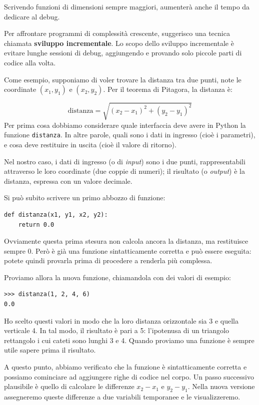 \documentclass[10pt]{book}
\begin{document}
Scrivendo funzioni di dimensioni sempre maggiori, aumenterà anche il tempo da dedicare al debug.

Per affrontare programmi di complessità crescente, suggerisco una tecnica chiamata {\bf sviluppo incrementale}. Lo scopo dello sviluppo incrementale è evitare lunghe sessioni di debug, aggiungendo e provando solo piccole parti di codice alla volta.

Come esempio, supponiamo di voler trovare la distanza tra due punti, note le coordinate $(x_1, y_1)$ e $(x_2, y_2)$.
Per il teorema di Pitagora, la distanza è:

\begin{displaymath}
\mathrm{distanza} = \sqrt{(x_2 - x_1)^2 + (y_2 - y_1)^2}
\end{displaymath}
%
Per prima cosa dobbiamo considerare quale interfaccia deve avere in Python la funzione {\tt distanza}. In altre parole, quali sono i dati in ingresso (cioè i parametri), e cosa deve restituire in uscita (cioè il valore di ritorno).

Nel nostro caso, i dati di ingresso (o di {\em input}) sono i due punti, rappresentabili attraverso le loro coordinate (due coppie di numeri); il risultato (o {\em output}) è la distanza, espressa con un valore decimale.

Si può subito scrivere un primo abbozzo di funzione:

\begin{verbatim}
def distanza(x1, y1, x2, y2):
    return 0.0
\end{verbatim}
%
Ovviamente questa prima stesura non calcola ancora la distanza, ma restituisce sempre 0. Però è già una funzione sintatticamente corretta e può essere eseguita: potete quindi provarla prima di procedere a renderla più complessa.

Proviamo allora la nuova funzione, chiamandola con dei valori di esempio:

\begin{verbatim}
>>> distanza(1, 2, 4, 6)
0.0
\end{verbatim}
%
Ho scelto questi valori in modo che la loro distanza orizzontale sia 3 e quella verticale 4. In tal modo, il risultato è pari a 5: l'ipotenusa di un triangolo rettangolo i cui cateti sono lunghi 3 e 4. Quando proviamo una funzione è sempre utile sapere prima il risultato.

A questo punto, abbiamo verificato che la funzione è sintatticamente corretta e possiamo cominciare ad aggiungere righe di codice nel corpo. Un passo successivo plausibile è quello di calcolare le differenze $x_2 - x_1$ e $y_2 - y_1$.  Nella nuova versione assegneremo queste differenze a due variabili temporanee e le visualizzeremo.
\end{document}
